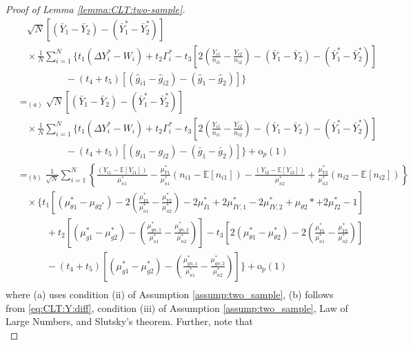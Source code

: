 \documentclass[12pt,letterpaper]{article}
\begin{document}
\begin{proof}[Proof of Lemma \ref{lemma:CLT:two-sample}]
\begin{equation}
\begin{array}{rl}
&\displaystyle\quad\sqrt{N}\left[(\bar{Y}_1-\bar{Y}_2)-(\bar{Y}_1^*-\bar{Y}_2^*)\right]\\
&\displaystyle\quad\times\frac{1}{N}\sum_{i=1}^N\Bigg\{t_1(\Delta Y_i^*-W_i)+t_2\Gamma_i^*-t_3\left[2\left(\frac{Y_{i1}}{n_{i1}}-\frac{Y_{i2}}{n_{i2}}\right)-(\bar{Y}_1-\bar{Y}_2)-(\bar{Y}_1^*-\bar{Y}_2^*)\right]\\
&\displaystyle\quad\quad\quad\quad\quad-(t_4+t_5)[(\hat{g}_{i1}-\hat{g}_{i2})-(\hat{g}_1-\hat{g}_2)]\Bigg\}\\
&\displaystyle=_{(a)}\sqrt{N}\left[(\bar{Y}_1-\bar{Y}_2)-(\bar{Y}_1^*-\bar{Y}_2^*)\right]\\
&\displaystyle\quad\times\frac{1}{N}\sum_{i=1}^N\Bigg\{t_1(\Delta Y_i^*-W_i)+t_2\Gamma_i^*-t_3\left[2\left(\frac{Y_{i1}}{n_{i1}}-\frac{Y_{i2}}{n_{i2}}\right)-(\bar{Y}_1-\bar{Y}_2)-(\bar{Y}_1^*-\bar{Y}_2^*)\right]\\
&\displaystyle\quad\quad\quad\quad\quad-(t_4+t_5)[(g_{i1}-g_{i2})-(\bar{g}_1-\bar{g}_2)]\Bigg\}+\mathrm{o}_p(1)\\
&\displaystyle=_{(b)}\frac{1}{\sqrt{N}}\sum_{i=1}^N\left\{\frac{(Y_{i1}-\mathbb{E}[Y_{i1}])}{\mu_{n1}^*}-\frac{\mu_{Y1}^*}{\mu_{n1}^*}(n_{i1}-\mathbb{E}[n_{i1}])-\frac{(Y_{i2}-\mathbb{E}[Y_{i2}])}{\mu_{n2}^*}+\frac{\mu_{Y2}^*}{\mu_{n2}^*}(n_{i2}-\mathbb{E}[n_{i2}])\right\}\\
&\displaystyle\quad\times\Bigg\{t_1\left[(\mu_{\theta1}^*-\mu_{\theta2^*})-2\left(\frac{\mu_{Y1}^*}{\mu_{n1}^*}-\frac{\mu_{Y2}^*}{\mu_{n2}^*}\right)-2\mu_{I1}^*+2\mu_{IY,1}^*-2\mu_{IY,2}^*+\mu_{\theta2}*+2\mu_{I2}^*-1\right]\\
&\displaystyle\quad\quad\quad+t_2\left[(\mu_{g1}^*-\mu_{g2}^*)-\left(\frac{\mu_{gn,1}^*}{\mu_{n1}^*}-\frac{\mu_{gn,2}^*}{\mu_{n2}^*}\right)\right]-t_3\left[2\left(\mu_{\theta1}^*-\mu_{\theta2}^*\right)-2\left(\frac{\mu_{Y1}^*}{\mu_{n1}^*}-\frac{\mu_{Y2}^*}{\mu_{n2}^*}\right)\right]\\
&\displaystyle\quad\quad\quad-(t_4+t_5)\left[(\mu_{g1}^*-\mu_{g2}^*)-\left(\frac{\mu_{gn,1}^*}{\mu_{n1}^*}-\frac{\mu_{gn,2}^*}{\mu_{n2}^*}\right)\right]\Bigg\}+\mathrm{o}_p(1)\\
\end{array}
\end{equation}
where (a) uses condition (ii) of Assumption \ref{assump:two_sample}, (b) follows from \eqref{eq:CLT:Y:diff}, condition (iii) of Assumption \ref{assump:two_sample}, Law of Large Numbers, and Slutsky's theorem. Further, note that 
\begin{equation}\label{eq:W:g}

\end{equation}
\end{proof}
\end{document}
